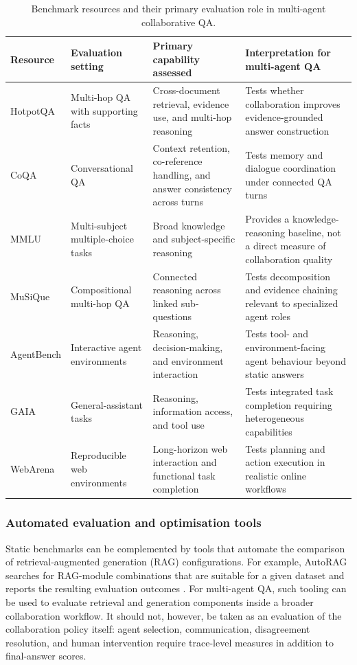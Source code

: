 \documentclass[a4paper,fleqn]{cas-dc}
\begin{document}
\begin{table}[t]
  \centering
  \caption{Benchmark resources and their primary evaluation role in multi-agent collaborative QA.}
  \label{tab:benchmark_resources}
  \small
  \begin{tabularx}{\textwidth}{p{2.3cm} p{2.6cm} X X}
    \toprule
    \textbf{Resource} & \textbf{Evaluation setting} & \textbf{Primary capability assessed} & \textbf{Interpretation for multi-agent QA} \\
    \midrule
    HotpotQA & Multi-hop QA with supporting facts & Cross-document retrieval, evidence use, and multi-hop reasoning & Tests whether collaboration improves evidence-grounded answer construction \\
    CoQA & Conversational QA & Context retention, co-reference handling, and answer consistency across turns & Tests memory and dialogue coordination under connected QA turns \\
    MMLU & Multi-subject multiple-choice tasks & Broad knowledge and subject-specific reasoning & Provides a knowledge-reasoning baseline, not a direct measure of collaboration quality \\
    MuSiQue & Compositional multi-hop QA & Connected reasoning across linked sub-questions & Tests decomposition and evidence chaining relevant to specialized agent roles \\
    AgentBench & Interactive agent environments & Reasoning, decision-making, and environment interaction & Tests tool- and environment-facing agent behaviour beyond static answers \\
    GAIA & General-assistant tasks & Reasoning, information access, and tool use & Tests integrated task completion requiring heterogeneous capabilities \\
    WebArena & Reproducible web environments & Long-horizon web interaction and functional task completion & Tests planning and action execution in realistic online workflows \\
    \bottomrule
  \end{tabularx}
\end{table}

\subsubsection{Automated evaluation and optimisation tools}

Static benchmarks can be complemented by tools that automate the comparison
of retrieval-augmented generation (RAG) configurations. For example, AutoRAG
searches for RAG-module combinations that are suitable for a given dataset and
reports the resulting evaluation outcomes \citep{autorag2024}. For multi-agent QA,
such tooling can be used to evaluate retrieval and generation components
inside a broader collaboration workflow. It should not, however, be taken as
an evaluation of the collaboration policy itself: agent selection,
communication, disagreement resolution, and human intervention require
trace-level measures in addition to final-answer scores.
\end{document}
